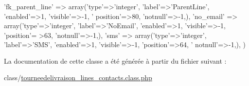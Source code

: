 \begin{DoxyCode}
        \textcolor{stringliteral}{'fk\_parent\_line'} => array(\textcolor{stringliteral}{'type'}=>\textcolor{stringliteral}{'integer'}, \textcolor{stringliteral}{'label'}=>\textcolor{stringliteral}{'ParentLine'}, \textcolor{stringliteral}{'enabled'}=>1, \textcolor{stringliteral}{'visible'}=>-1, \textcolor{stringliteral}{'
      position'}=>80, \textcolor{stringliteral}{'notnull'}=>-1,),
        \textcolor{stringliteral}{'no\_email'} => array(\textcolor{stringliteral}{'type'}=>\textcolor{stringliteral}{'integer'}, \textcolor{stringliteral}{'label'}=>\textcolor{stringliteral}{'NoEmail'}, \textcolor{stringliteral}{'enabled'}=>1, \textcolor{stringliteral}{'visible'}=>-1, \textcolor{stringliteral}{'position'}=
      >63, \textcolor{stringliteral}{'notnull'}=>-1,),
        \textcolor{stringliteral}{'sms'} => array(\textcolor{stringliteral}{'type'}=>\textcolor{stringliteral}{'integer'}, \textcolor{stringliteral}{'label'}=>\textcolor{stringliteral}{'SMS'}, \textcolor{stringliteral}{'enabled'}=>1, \textcolor{stringliteral}{'visible'}=>-1, \textcolor{stringliteral}{'position'}=>64, \textcolor{stringliteral}{'
      notnull'}=>-1,),
    )
\end{DoxyCode}


La documentation de cette classe a été générée à partir du fichier suivant \+:\begin{DoxyCompactItemize}
\item 
class/\hyperlink{tourneedelivraison__lines__contacts_8class_8php}{tourneedelivraison\+\_\+lines\+\_\+contacts.\+class.\+php}\end{DoxyCompactItemize}
